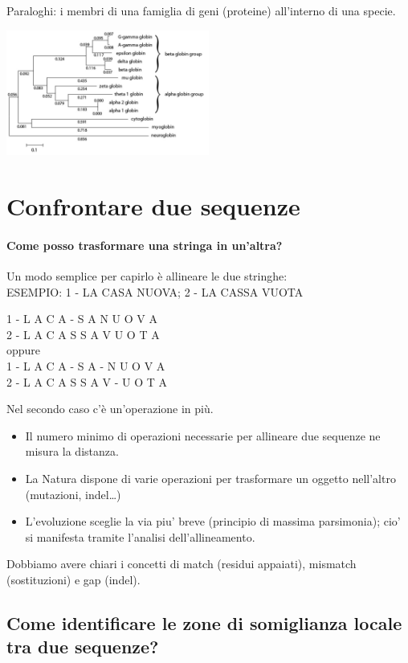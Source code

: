 \documentclass{article}
\begin{document}
Paraloghi: i membri di una famiglia di geni (proteine) all'interno di una specie.
\begin{center}
    \includegraphics[width=0.5\textwidth]{figures/ortpar3.png}
\end{center}
\section{Confrontare due sequenze}
\paragraph{Come posso trasformare una stringa in un'altra?} 
Un modo semplice per capirlo è allineare le due stringhe:\\
ESEMPIO: 1 - LA CASA NUOVA; 2 - LA CASSA VUOTA\\
\begin{center}
    1 - L A C A - S A N U O V A\\
    2 - L A C A S S A V U O T A\\
    oppure\\
    1 - L A C A - S A - N U O V A\\
    2 - L A C A S S A V - U O T A\\
\end{center}
Nel secondo caso c'è un'operazione in più. 
\begin{itemize}
    \item Il numero minimo di operazioni necessarie per allineare
    due sequenze ne misura la distanza.
    \item La Natura dispone di varie operazioni per trasformare un
    oggetto nell'altro (mutazioni, indel…)
    \item L'evoluzione sceglie la via piu' breve (principio di
    massima parsimonia); cio' si manifesta tramite l'analisi
    dell'allineamento.
\end{itemize}
Dobbiamo avere chiari i concetti di match (residui
appaiati), mismatch (sostituzioni) e gap (indel).
\subsection{Come identificare le zone di somiglianza locale tra due sequenze?}
\end{document}
